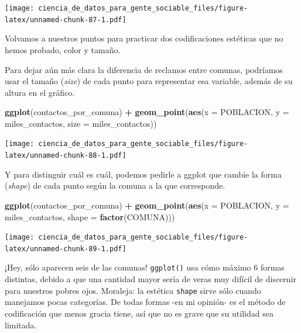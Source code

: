 \documentclass[]{book}
\newenvironment{Shaded}{\begin{snugshade}}{\end{snugshade}}
\newcommand{\KeywordTok}[1]{\textcolor[rgb]{0.13,0.29,0.53}{\textbf{#1}}}
\newcommand{\DataTypeTok}[1]{\textcolor[rgb]{0.13,0.29,0.53}{#1}}
\newcommand{\StringTok}[1]{\textcolor[rgb]{0.31,0.60,0.02}{#1}}
\newcommand{\OperatorTok}[1]{\textcolor[rgb]{0.81,0.36,0.00}{\textbf{#1}}}
\newcommand{\NormalTok}[1]{#1}
\begin{document}
\texttt{[image: ciencia\_de\_datos\_para\_gente\_sociable\_files/figure-latex/unnamed-chunk-87-1.pdf]}

Volvamos a nuestros puntos para practicar dos codificaciones estéticas
que no hemos probado, color y tamaño.

Para dejar aún más clara la diferencia de reclamos entre comunas,
podríamos usar el tamaño (\emph{size}) de cada punto para representar
esa variable, además de su altura en el gráfico.

\begin{Shaded}
\begin{Highlighting}[]
\KeywordTok{ggplot}\NormalTok{(contactos_por_comuna) }\OperatorTok{+}\StringTok{ }
\StringTok{    }\KeywordTok{geom_point}\NormalTok{(}\KeywordTok{aes}\NormalTok{(}\DataTypeTok{x =}\NormalTok{ POBLACION, }\DataTypeTok{y =}\NormalTok{ miles_contactos, }\DataTypeTok{size =}\NormalTok{ miles_contactos))}
\end{Highlighting}
\end{Shaded}

\texttt{[image: ciencia\_de\_datos\_para\_gente\_sociable\_files/figure-latex/unnamed-chunk-88-1.pdf]}

Y para distinguir cuál es cuál, podemos pedirle a ggplot que cambie la
forma (\emph{shape}) de cada punto según la comuna a la que corresponde.

\begin{Shaded}
\begin{Highlighting}[]
\KeywordTok{ggplot}\NormalTok{(contactos_por_comuna) }\OperatorTok{+}\StringTok{ }
\StringTok{    }\KeywordTok{geom_point}\NormalTok{(}\KeywordTok{aes}\NormalTok{(}\DataTypeTok{x =}\NormalTok{ POBLACION, }\DataTypeTok{y =}\NormalTok{ miles_contactos, }\DataTypeTok{shape =} \KeywordTok{factor}\NormalTok{(COMUNA)))}
\end{Highlighting}
\end{Shaded}

\texttt{[image: ciencia\_de\_datos\_para\_gente\_sociable\_files/figure-latex/unnamed-chunk-89-1.pdf]}

¡Hey, sólo aparecen seis de las comunas! \texttt{ggplot()} usa cómo
máximo 6 formas distintas, debido a que una cantidad mayor sería de
veras muy difícil de discernir para nuestros pobres ojos. Moraleja: la
estética \texttt{shape} sirve sólo cuando manejamos pocas categorías. De
todas formas -en mi opinión- es el método de codificación que menos
gracia tiene, así que no es grave que su utilidad sea limitada.
\end{document}
